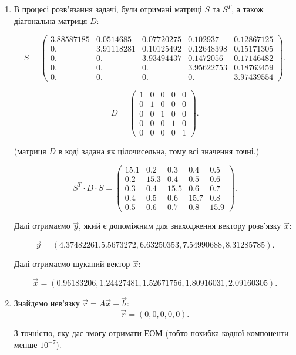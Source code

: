 \begin{enumerate}

\item В процесі розв’язання задачі, були отримані матриці $S$ та $S^T$, а також діагональна матриця $D$:

\[ S = \begin{pmatrix} 3.88587185 & 0.0514685 & 0.07720275 & 0.102937 & 0.12867125 \\ 0. & 3.91118281 & 0.10125492 & 0.12648398 & 0.15171305 \\ 0. & 0. & 3.93494437 & 0.1472056 & 0.17146482 \\ 0. & 0. & 0. & 3.95622753 & 0.18763459 \\ 0. & 0. & 0. & 0. & 3.97439554 \end{pmatrix}. \]

\[ D = \begin{pmatrix} 1 & 0 & 0 & 0 & 0 \\ 0 & 1 & 0 & 0 & 0 \\ 0 & 0 & 1 & 0 & 0 \\ 0 & 0 & 0 & 1 & 0 \\ 0 & 0 & 0 & 0 & 1 \end{pmatrix}. \]

(матриця $D$ в коді задана як цілочисельна, тому всі значення точні.)

\[ S^T \cdot D \cdot S = \begin{pmatrix} 15.1 & 0.2 & 0.3 & 0.4 & 0.5 \\ 0.2 & 15.3 & 0.4 & 0.5 & 0.6 \\ 0.3 & 0.4 & 15.5 & 0.6 & 0.7 \\ 0.4 & 0.5 & 0.6 & 15.7 & 0.8 \\ 0.5 & 0.6 & 0.7 & 0.8 & 15.9 \end{pmatrix}. \]

Далі отримаємо $\vec y$, який є допоміжним для знаходження вектору розв’язку $\vec x$:

\[ \vec y = (4.37482261. 5.5673272, 6.63250353, 7.54990688, 8.31285785). \]

Далі отримаємо шуканий вектор $\vec x$:

\[ \vec x = (0.96183206, 1.24427481, 1.52671756, 1.80916031, 2.09160305). \]

\item Знайдемо нев'язку $\vec r = A \vec x - \vec b$:
\[ \vec r = (0, 0, 0, 0, 0). \]

З точністю, яку дає змогу отримати ЕОМ (тобто похибка кодної компоненти менше $10^{-7}$).  \\


\end{enumerate}
